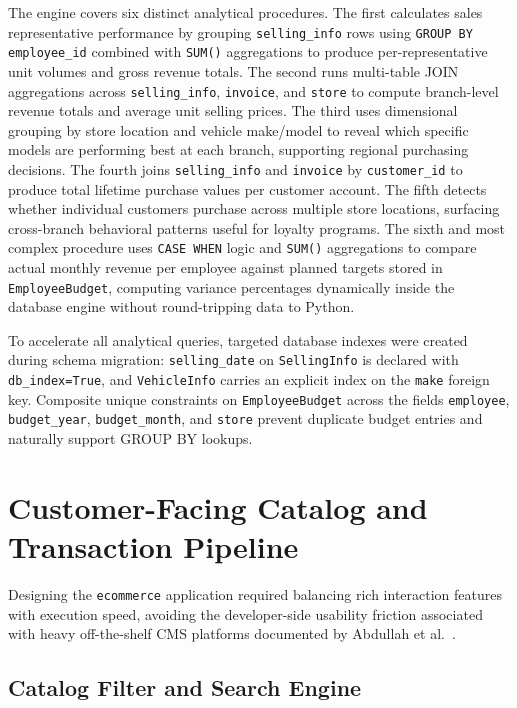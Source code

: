 The engine covers six distinct analytical procedures. The first calculates sales representative performance by grouping \texttt{selling\_info} rows using \texttt{GROUP BY employee\_id} combined with \texttt{SUM()} aggregations to produce per-representative unit volumes and gross revenue totals. The second runs multi-table JOIN aggregations across \texttt{selling\_info}, \texttt{invoice}, and \texttt{store} to compute branch-level revenue totals and average unit selling prices. The third uses dimensional grouping by store location and vehicle make/model to reveal which specific models are performing best at each branch, supporting regional purchasing decisions. The fourth joins \texttt{selling\_info} and \texttt{invoice} by \texttt{customer\_id} to produce total lifetime purchase values per customer account. The fifth detects whether individual customers purchase across multiple store locations, surfacing cross-branch behavioral patterns useful for loyalty programs. The sixth and most complex procedure uses \texttt{CASE WHEN} logic and \texttt{SUM()} aggregations to compare actual monthly revenue per employee against planned targets stored in \texttt{Employee}\allowbreak\texttt{Budget}, computing variance percentages dynamically inside the database engine without round-tripping data to Python.

To accelerate all analytical queries, targeted database indexes were created during schema migration: \texttt{selling\_date} on \texttt{SellingInfo} is declared with \texttt{db\_index=True}, and \texttt{VehicleInfo} carries an explicit index on the \texttt{make} foreign key. Composite unique constraints on \texttt{Employee}\allowbreak\texttt{Budget} across the fields \texttt{employee}, \texttt{budget\_year}, \texttt{budget\_month}, and \texttt{store} prevent duplicate budget entries and naturally support GROUP BY lookups.

\section{Customer-Facing Catalog and Transaction Pipeline}

Designing the \texttt{ecommerce} application required balancing rich interaction features with execution speed, avoiding the developer-side usability friction associated with heavy off-the-shelf CMS platforms documented by Abdullah et al.~\cite{abdullah2021evaluating}.

\subsection{Catalog Filter and Search Engine}

